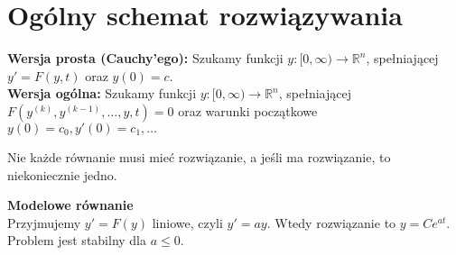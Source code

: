 \section{Ogólny schemat rozwiązywania}
\textbf{Wersja prosta (Cauchy’ego): } Szukamy funkcji \(y: [0, \infty) \rightarrow \mathbb{R}^n \), spełniającej \( y' = F(y,t) \) oraz \( y(0) = c \). \\
\textbf{Wersja ogólna:} Szukamy funkcji \(y: [0, \infty) \rightarrow \mathbb{R}^n \), spełniającej \( F(y^{(k)}, y^{(k-1)}, \dots, y, t) = 0 \) oraz warunki początkowe \( y(0) = c_0, y'(0) = c_1, \dots \)
\begin{warning}
	Nie każde równanie musi mieć rozwiązanie, a jeśli ma rozwiązanie, to niekoniecznie jedno.
\end{warning}

\noindent
\textbf{Modelowe równanie} \\
Przyjmujemy \( y' = F(y) \) liniowe, czyli \( y' = ay \). Wtedy rozwiązanie to \( y = Ce^{at} \). Problem jest stabilny dla \( a \leq 0 \).